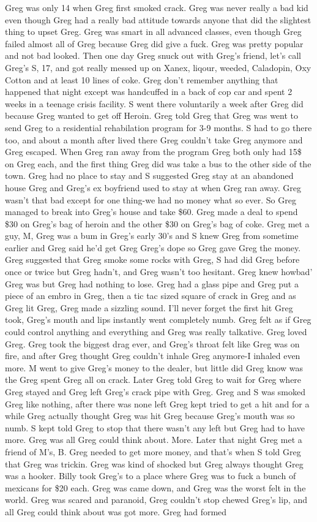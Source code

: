 \documentclass[12pt]{book}
\begin{document}
Greg was only 14 when Greg first smoked crack. Greg was never really a bad kid even though Greg had a really bad attitude towards anyone that did the slightest thing to upset Greg. Greg was smart in all advanced classes, even though Greg failed almost all of Greg because Greg did give a fuck. Greg was pretty popular and not bad looked. Then one day Greg snuck out with Greg's friend, let's call Greg's S, 17, and got really messed up on Xanex, liqour, weeded, Caladopin, Oxy Cotton and at least 10 lines of coke. Greg don't remember anything that happened that night except was handcuffed in a back of cop car and spent 2 weeks in a teenage crisis facility. S went there voluntarily a week after Greg did because Greg wanted to get off Heroin. Greg told Greg that Greg was went to send Greg to a residential rehabilation program for 3-9 months. S had to go there too, and about a month after lived there Greg couldn't take Greg anymore and Greg escaped. When Greg ran away from the program Greg both only had 15\$ on Greg each, and the first thing Greg did was take a bus to the other side of the town. Greg had no place to stay and S suggested Greg stay at an abandoned house Greg and Greg's ex boyfriend used to stay at when Greg ran away. Greg wasn't that bad except for one thing-we had no money what so ever. So Greg managed to break into Greg's house and take \$60. Greg made a deal to spend \$30 on Greg's bag of heroin and the other \$30 on Greg's bag of coke. Greg met a guy, M, Greg was a bum in Greg's early 30's and S knew Greg from sometime earlier and Greg said he'd get Greg Greg's dope so Greg gave Greg the money. Greg suggested that Greg smoke some rocks with Greg, S had did Greg before once or twice but Greg hadn't, and Greg wasn't too hesitant. Greg knew howbad' Greg was but Greg had nothing to lose. Greg had a glass pipe and Greg put a piece of an embro in Greg, then a tic tac sized square of crack in Greg and as Greg lit Greg, Greg made a sizzling sound. I'll never forget the first hit Greg took, Greg's mouth and lips instantly went completely numb. Greg felt as if Greg could control anything and everything and Greg was really talkative. Greg loved Greg. Greg took the biggest drag ever, and Greg's throat felt like Greg was on fire, and after Greg thought Greg couldn't inhale Greg anymore-I inhaled even more. M went to give Greg's money to the dealer, but little did Greg know was the Greg spent Greg all on crack. Later Greg told Greg to wait for Greg where Greg stayed and Greg left Greg's crack pipe with Greg. Greg and S was smoked Greg like nothing, after there was none left Greg kept tried to get a hit and for a while Greg actually thought Greg was hit Greg because Greg's mouth was so numb. S kept told Greg to stop that there wasn't any left but Greg had to have more. Greg was all Greg could think about. More. Later that night Greg met a friend of M's, B. Greg needed to get more money, and that's when S told Greg that Greg was trickin. Greg was kind of shocked but Greg always thought Greg was a hooker. Billy took Greg's to a place where Greg was to fuck a bunch of mexicans for \$20 each. Greg was came down, and Greg was the worst felt in the world. Greg was scared and paranoid, Greg couldn't stop chewed Greg's lip, and all Greg could think about was got more. Greg had formed 
\end{document}
